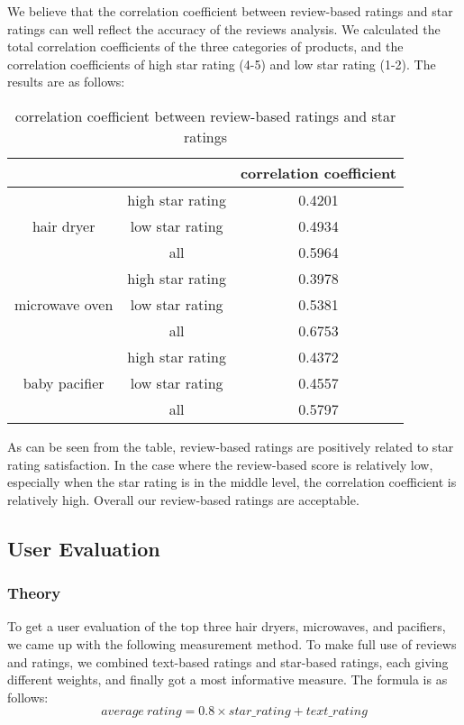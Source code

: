 \documentclass{mcmthesis}
\begin{document}
	We believe that the correlation coefficient between review-based ratings and star ratings can well reflect the accuracy of the reviews analysis. We calculated the total correlation coefficients of the three categories of products, and the correlation coefficients of high star rating (4-5) and low star rating (1-2). The results are as follows:
	
	
	
	\begin{table}[h]
		\begin{center} 
			\caption{correlation coefficient between review-based ratings and star ratings}
			\begin{tabular}{|c|c|c|}
				\hline
				&                  & correlation coefficient \\ \hline
				\multirow{3}{*}{hair dryer}     & high star rating & 0.4201                  \\ \cline{2-3} 
				& low star rating  & 0.4934                  \\ \cline{2-3} 
				& all              & 0.5964                  \\ \hline
				\multirow{3}{*}{microwave oven} & high star rating & 0.3978                  \\ \cline{2-3} 
				& low star rating  & 0.5381                  \\ \cline{2-3} 
				& all              & 0.6753                  \\ \hline
				\multirow{3}{*}{baby pacifier}  & high star rating & 0.4372                  \\ \cline{2-3} 
				& low star rating  & 0.4557                  \\ \cline{2-3} 
				& all              & 0.5797                  \\ \hline
			\end{tabular}
		\end{center}
	\end{table}
	
	
	As can be seen from the table, review-based ratings are positively related to star rating satisfaction. In the case where the review-based score is relatively low, especially when the star rating is in the middle level, the correlation coefficient is relatively high. Overall our review-based ratings are acceptable.
	
	
	\subsection{User Evaluation}
	\subsubsection{Theory}
	To get a user evaluation of the top three hair dryers, microwaves, and pacifiers, we came up with the following measurement method. To make full use of reviews and ratings, we combined text-based ratings and star-based ratings, each giving different weights, and finally got a most informative measure. The formula is as follows:
	$$
	average\ rating = 0.8 \times star\_rating + text\_rating
	$$
	
\end{document}
